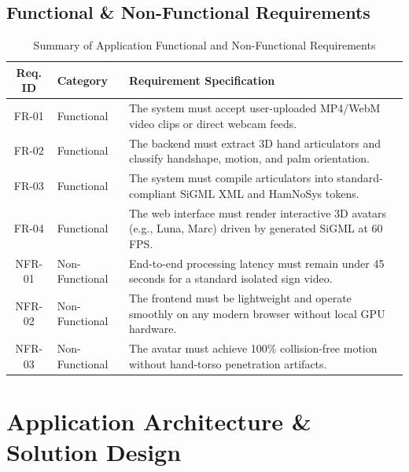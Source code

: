 \documentclass[11pt, a4paper]{article}
\begin{document}
\subsection{Functional \& Non-Functional Requirements}
\begin{table}[H]
    \centering
    \footnotesize
    \renewcommand{\arraystretch}{1.25}
    \begin{tabular}{|c|p{3.0cm}|p{9.2cm}|}
        \hline
        \textbf{Req. ID} & \textbf{Category} & \textbf{Requirement Specification} \\
        \hline
        FR-01 & Functional & The system must accept user-uploaded MP4/WebM video clips or direct webcam feeds. \\
        \hline
        FR-02 & Functional & The backend must extract 3D hand articulators and classify handshape, motion, and palm orientation. \\
        \hline
        FR-03 & Functional & The system must compile articulators into standard-compliant SiGML XML and HamNoSys tokens. \\
        \hline
        FR-04 & Functional & The web interface must render interactive 3D avatars (e.g., Luna, Marc) driven by generated SiGML at 60 FPS. \\
        \hline
        NFR-01 & Non-Functional & End-to-end processing latency must remain under 45 seconds for a standard isolated sign video. \\
        \hline
        NFR-02 & Non-Functional & The frontend must be lightweight and operate smoothly on any modern browser without local GPU hardware. \\
        \hline
        NFR-03 & Non-Functional & The avatar must achieve 100\% collision-free motion without hand-torso penetration artifacts. \\
        \hline
    \end{tabular}
    \caption{Summary of Application Functional and Non-Functional Requirements}
\end{table}

\section{Application Architecture \& Solution Design}
\end{document}
